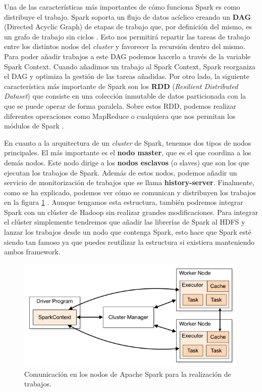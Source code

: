 Una de las características más importantes de cómo funciona Spark es como
distribuye el trabajo. Spark soporta un flujo de datos acíclico creando un
\textbf{DAG} (Directed Acyclic Graph) de etapas de trabajo que, por
definición del mismo, es un grafo de trabajo sin ciclos \cite{Spk-5}. Esto
nos permitirá repartir las tareas de trabajo entre los distintos nodos del
\emph{cluster} y favorecer la recursión dentro del mismo. Para poder añadir
trabajos a este DAG podemos hacerlo a través de la variable Spark Context.
Cuando añadimos un trabajo al Spark Context, Spark reorganiza el DAG y
optimiza la gestión de las tareas añadidas. Por otro lado, la siguiente
característica más importante de Spark son los \textbf{RDD} ({\em Resilient
  Distributed Dataset}) que consiste en una colección inmutable de datos
particionada con la que se puede operar de forma paralela. Sobre estos RDD,
podemos realizar diferentes operaciones como MapReduce o cualquiera que nos
permitan los módulos de Spark \cite{Spk-4}.

En cuanto a la arquitectura de un \emph{cluster} de Spark, tenemos dos tipos de
nodos principales. El más importante es el \textbf{nodo master}, que es el
que coordina a los demás nodos. Este nodo dirige a los \textbf{nodos
  esclavos} (o slaves) que son los que ejecutan los trabajos de Spark.
Además de estos nodos, podemos añadir un servicio de monitorización de
trabajos que se llama \textbf{history-server}. Finalmente, como se ha
explicado, podemos ver cómo se comunican y distribuyen los trabajos en la
figura \ref{SpkImg-1} \cite{Spk-6}. Aunque tengamos esta estructura,
también podremos integrar Spark con un clúster de Hadoop sin realizar
grandes modificaciones. Para integrar el clúster simplemente tendremos que
añadir las librerías de Spark al HDFS y lanzar los trabajos desde un nodo
que contenga Spark, esto hace que Spark esté siendo tan famoso ya que
puedes reutilizar la estructura si existiera manteniendo ambos framework.

\begin{figure}[htp]
\centering
\includegraphics[scale=0.65]{Imagenes/spark1.png}
\caption{Comunicación en los nodos de Apache Spark para la realización de
  trabajos.}
\label{SpkImg-1}
\end{figure}

